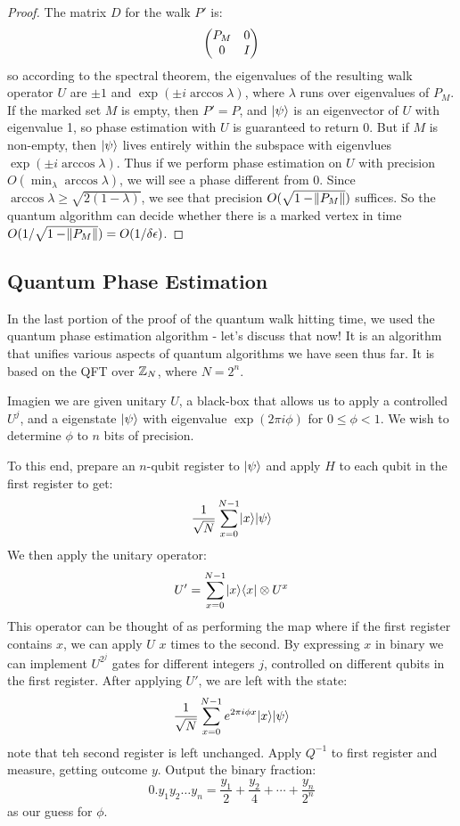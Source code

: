\begin{proof}
    The matrix $D$ for the walk $P'$ is:
    \begin{equation}
        \begin{pmatrix}P_M & 0 \\ 0 & I\end{pmatrix}
    \end{equation}
    so according to the spectral theorem, the eigenvalues of the resulting walk operator $U$ are $\pm 1$ and $\exp(\pm i \arccos \lambda)$, where $\lambda$ runs over eigenvalues of $P_M$. If the marked set $M$ is empty, then $P' = P$, and $\lvert \psi \rangle$ is an eigenvector of $U$ with eigenvalue 1, so phase estimation with $U$ is guaranteed to return 0. But if $M$ is non-empty, then $\lvert \psi \rangle$ lives entirely within the subspace with eigenvlues $\exp(\pm i \arccos \lambda)$. Thus if we perform phase estimation on $U$ with precision $O(\min_\lambda \arccos \lambda)$, we will see a phase different from 0. Since $\arccos \lambda \geq \sqrt{2(1-\lambda)}$, we see that precision $O(\sqrt{1-\norm{P_M}})$ suffices. So the quantum algorithm can decide whether there is a marked vertex in time $O(1/\sqrt{1-\norm{P_M}}) = O(1/\delta\epsilon)$. 
\end{proof}

\subsection*{Quantum Phase Estimation}
In the last portion of the proof of the quantum walk hitting time, we used the quantum phase estimation algorithm - let's discuss that now! It is an algorithm that unifies various aspects of quantum algorithms we have seen thus far. It is based on the QFT over $\mathbb{Z}_N$, where $N = 2^n$. 

Imagien we are given unitary $U$, a black-box that allows us to apply a controlled $U^j$, and a eigenstate $\lvert \psi \rangle$ with eigenvalue $\exp(2\pi i \phi)$ for $0 \leq \phi < 1$. We wish to determine $\phi$ to $n$ bits of precision.

To this end, prepare an $n$-qubit register to $\lvert \psi \rangle$ and apply $H$ to each qubit in the first register to get:
\begin{equation}
    \frac{1}{\sqrt{N}}\sum_{x=0}^{N-1}\lvert x \rangle\lvert \psi \rangle
\end{equation}
We then apply the unitary operator:
\begin{equation}
    U' = \sum_{x=0}^{N-1}\lvert x \rangle \langle x \rvert \otimes U^x
\end{equation}
This operator can be thought of as performing the map where if the first register contains $x$, we can apply $U$ $x$ times to the second. By expressing $x$ in binary we can implement $U^{2^j}$ gates for different integers $j$, controlled on different qubits in the first register. After applying $U'$, we are left with the state:
\begin{equation}
    \frac{1}{\sqrt{N}}\sum_{x=0}^{N-1}e^{2\pi i \phi x}\lvert x \rangle\lvert \psi \rangle
\end{equation}
note that teh second register is left unchanged. Apply $Q^{-1}$ to first register and measure, getting outcome $y$. Output the binary fraction:
\begin{equation}
    0.y_1y_2\ldots y_n = \frac{y_1}{2} + \frac{y_2}{4} + \cdots + \frac{y_n}{2^n}
\end{equation}
as our guess for $\phi$.

